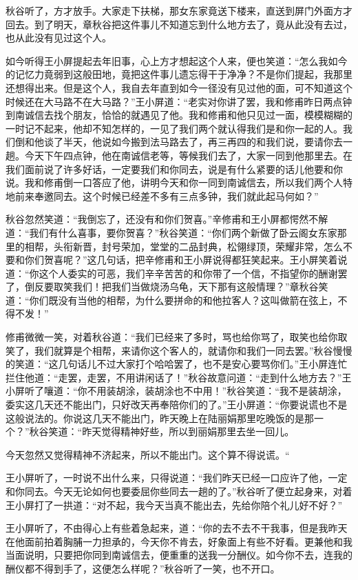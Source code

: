 \documentclass[12pt,UTF8]{ctexbook}
\begin{document}
{{{秋谷听了，方才放手。大家走下扶梯，那女东家竟送下楼来，直送到屏门外面方才回去。到了明天，章秋谷把这件事儿不知道忘到什么地方去了，竟从此没有去过，也从此没有见过这个人。

如今听得王小屏提起去年旧事，心上方才想起这个人来，便也笑道：“怎么我如今的记忆力竟弱到这般田地，竟把这件事儿遗忘得干于净净？不是你们提起，我那里还想得出来。但是这个人，我自去年直到如今一径没有见过他的面，可不知道这个时候还在大马路不在大马路？”王小屏道：“老实对你讲了罢，我和修甫昨日两点钟到南诚信去找个朋友，恰恰的就遇见了他。我和修甫和他只见过一面，模模糊糊的一时记不起来，他却不知怎样的，一见了我们两个就认得我们是和你一起的人。我们倒和他谈了半天，他说如今搬到法马路去了，再三再四的和我们说，要请你去一趟。今天下午四点钟，他在南诚信老等，等候我们去了，大家一同到他那里去。在我们面前说了许多好话，一定要我们和你同去，说是有什么紧要的话儿他要和你说。我和修甫倒一口答应了他，讲明今天和你一同到南诚信去，所以我们两个人特地前来奉邀同去。这个时候已经差不多有三点多钟，我们就此起马何如？”

秋谷忽然笑道：“我倒忘了，还没有和你们贺喜。”辛修甫和王小屏都愕然不解道：“我们有什么喜事，要你贺喜？”秋谷笑道：“你们两个新做了卧云阁女东家那里的相帮，头衔新晋，封号荣加，堂堂的二品封典，松翎绿顶，荣耀非常，怎么不要和你们贺喜呢？”这几句话，把辛修甫和王小屏说得都狂笑起来。王小屏笑着说道：“你这个人委实的可恶，我们辛辛苦苦的和你带了一个信，不指望你的酬谢罢了，倒反要取笑我们！把我们当做烧汤乌龟，天下那有这般情理？”章秋谷笑道：“你们既没有当他的相帮，为什么要拼命的和他拉客人？这叫做箭在弦上，不得不发！”

修甫微微一笑，对着秋谷道：“我们已经来了多时，骂也给你骂了，取笑也给你取笑了，我们就算是个相帮，来请你这个客人的，就请你和我们一同去罢。”秋谷慢慢的笑道：“这几句话儿不过大家打个哈哈罢了，也不是安心要骂你们。”王小屏连忙拦住他道：“走罢，走罢，不用讲闲话了！”秋谷故意问道：“走到什么地方去？”王小屏听了嚷道：“你不用装胡涂，装胡涂也不中用！”秋谷笑道：“我不是装胡涂，委实这几天还不能出门，只好改天再奉陪你们的了。”王小屏道：“你要说谎也不是这般说法的。你说这几天不能出门，昨天晚上在陆丽娟那里吃晚饭的是那一个？”秋谷笑道：“昨天觉得精神好些，所以到丽娟那里去坐一回儿。

今天忽然又觉得精神不济起来，所以不能出门。这个算不得说谎。“

王小屏听了，一时说不出什么来，只得说道：“我们昨天已经一口应许了他，一定和你同去。今天无论如何也要委屈你些同去一趟的了。”秋谷听了便立起身来，对着王小屏打了一拱道：“对不起，我今天当真不能出去，先给你陪个礼儿好不好？”

王小屏听了，不由得心上有些着急起来，道：“你的去不去不干我事，但是我昨天在他面前拍着胸脯一力担承的，今天你不肯去，好象面上有些不好看。更兼他和我当面说明，只要把你同到南诚信去，便重重的送我一分酬仪。如今你不去，连我的酬仪都不得到手了，这便怎么样呢？”秋谷听了一笑，也不开口。

}}}
\end{document}
